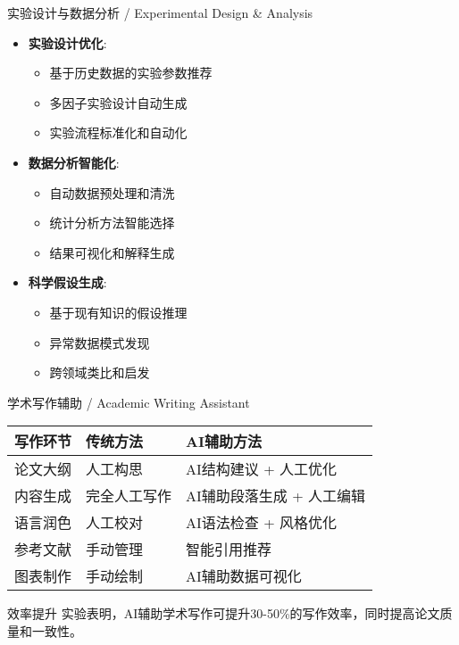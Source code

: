 \documentclass[aspectratio=169]{beamer}
\begin{document}
\begin{frame}{实验设计与数据分析 / Experimental Design \& Analysis}
\begin{itemize}
    \item \textbf{实验设计优化}:
        \begin{itemize}
            \item 基于历史数据的实验参数推荐
            \item 多因子实验设计自动生成
            \item 实验流程标准化和自动化
        \end{itemize}
    \item \textbf{数据分析智能化}:
        \begin{itemize}
            \item 自动数据预处理和清洗
            \item 统计分析方法智能选择
            \item 结果可视化和解释生成
        \end{itemize}
    \item \textbf{科学假设生成}:
        \begin{itemize}
            \item 基于现有知识的假设推理
            \item 异常数据模式发现
            \item 跨领域类比和启发
        \end{itemize}
\end{itemize}
\end{frame}

\begin{frame}{学术写作辅助 / Academic Writing Assistant}
\begin{table}
\centering
\begin{tabular}{l|l|l}
\toprule
\textbf{写作环节} & \textbf{传统方法} & \textbf{AI辅助方法} \\
\midrule
论文大纲 & 人工构思 & AI结构建议 + 人工优化 \\
内容生成 & 完全人工写作 & AI辅助段落生成 + 人工编辑 \\
语言润色 & 人工校对 & AI语法检查 + 风格优化 \\
参考文献 & 手动管理 & 智能引用推荐 \\
图表制作 & 手动绘制 & AI辅助数据可视化 \\
\bottomrule
\end{tabular}
\end{table}

\begin{block}{效率提升}
实验表明，AI辅助学术写作可提升30-50\%的写作效率，同时提高论文质量和一致性。
\end{block}
\end{frame}
\end{document}
